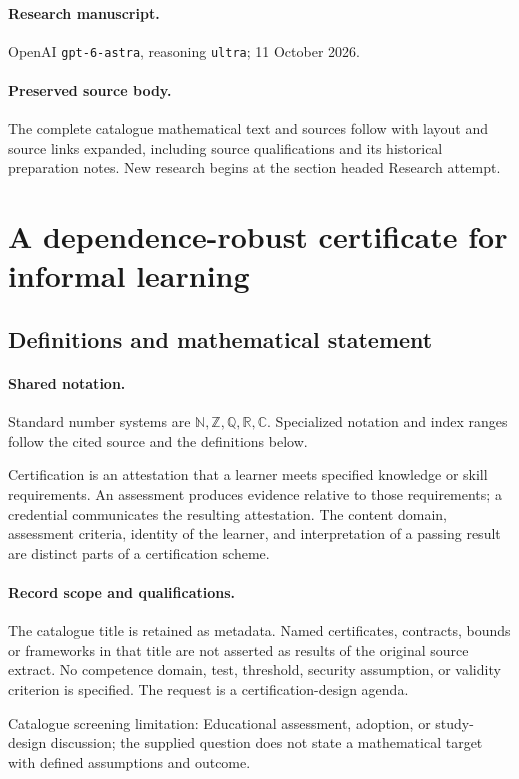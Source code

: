 \documentclass[11pt]{article}
\begin{document}
\paragraph{Research manuscript.} OpenAI \texttt{gpt-6-astra}, reasoning \texttt{ultra}; 11 October 2026.
\paragraph{Preserved source body.} The complete catalogue mathematical text and sources follow with layout and source links expanded, including source qualifications and its historical preparation notes. New research begins at the section headed Research attempt.

\section{A dependence-robust certificate for informal learning}\label{statement}

\subsection{Definitions and mathematical statement}

\paragraph{Shared notation.}Standard number systems are $\mathbb N,\mathbb Z,\mathbb Q,\mathbb R,\mathbb C$. Specialized notation and index ranges follow the cited source and the definitions below.


Certification is an attestation that a learner meets specified knowledge or skill requirements. An assessment produces evidence relative to those requirements; a credential communicates the resulting attestation. The content domain, assessment criteria, identity of the learner, and interpretation of a passing result are distinct parts of a certification scheme.
\paragraph{Record scope and qualifications.}
The catalogue title is retained as metadata. Named certificates, contracts, bounds or frameworks in that title are not asserted as results of the original source extract.
No competence domain, test, threshold, security assumption, or validity criterion is specified. The request is a certification-design agenda.

Catalogue screening limitation: Educational assessment, adoption, or study-design discussion; the supplied question does not state a mathematical target with defined assumptions and outcome.
\end{document}

